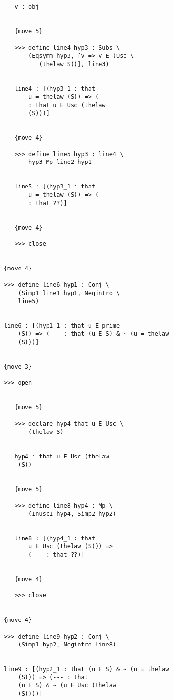 \documentclass[12pt]{article}
\begin{document}
\begin{verbatim}
               v : obj


               {move 5}

               >>> define line4 hyp3 : Subs \
                   (Eqsymm hyp3, [v => v E (Usc \
                      (thelaw S))], line3)


               line4 : [(hyp3_1 : that 
                   u = thelaw (S)) => (--- 
                   : that u E Usc (thelaw 
                   (S)))]


               {move 4}

               >>> define line5 hyp3 : line4 \
                   hyp3 Mp line2 hyp1


               line5 : [(hyp3_1 : that 
                   u = thelaw (S)) => (--- 
                   : that ??)]


               {move 4}

               >>> close


            {move 4}

            >>> define line6 hyp1 : Conj \
                (Simp1 line1 hyp1, Negintro \
                line5)


            line6 : [(hyp1_1 : that u E prime 
                (S)) => (--- : that (u E S) & ~ (u = thelaw 
                (S)))]


            {move 3}

            >>> open


               {move 5}

               >>> declare hyp4 that u E Usc \
                   (thelaw S)


               hyp4 : that u E Usc (thelaw 
                (S))


               {move 5}

               >>> define line8 hyp4 : Mp \
                   (Inusc1 hyp4, Simp2 hyp2)


               line8 : [(hyp4_1 : that 
                   u E Usc (thelaw (S))) => 
                   (--- : that ??)]


               {move 4}

               >>> close


            {move 4}

            >>> define line9 hyp2 : Conj \
                (Simp1 hyp2, Negintro line8)


            line9 : [(hyp2_1 : that (u E S) & ~ (u = thelaw 
                (S))) => (--- : that 
                (u E S) & ~ (u E Usc (thelaw 
                (S))))]



\end{verbatim}
\end{document}

